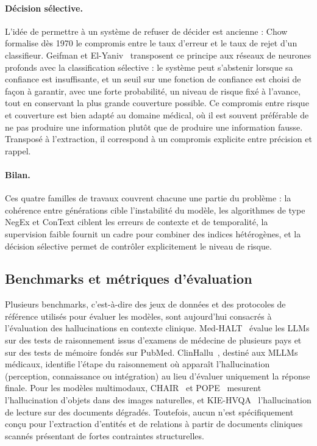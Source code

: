\paragraph{Décision sélective.}
L'idée de permettre à un système de refuser de décider est ancienne : Chow~\cite{chow1970reject} formalise dès 1970 le compromis entre le taux d'erreur et le taux de rejet d'un classifieur. Geifman et El-Yaniv~\cite{geifman2017selective} transposent ce principe aux réseaux de neurones profonds avec la classification sélective : le système peut s'abstenir lorsque sa confiance est insuffisante, et un seuil sur une fonction de confiance est choisi de façon à garantir, avec une forte probabilité, un niveau de risque fixé à l'avance, tout en conservant la plus grande couverture possible. Ce compromis entre risque et couverture est bien adapté au domaine médical, où il est souvent préférable de ne pas produire une information plutôt que de produire une information fausse. Transposé à l'extraction, il correspond à un compromis explicite entre précision et rappel.

\paragraph{Bilan.}
Ces quatre familles de travaux couvrent chacune une partie du problème : la cohérence entre générations cible l'instabilité du modèle, les algorithmes de type NegEx et ConText ciblent les erreurs de contexte et de temporalité, la supervision faible fournit un cadre pour combiner des indices hétérogènes, et la décision sélective permet de contrôler explicitement le niveau de risque.

\subsection{Benchmarks et métriques d'évaluation}

Plusieurs benchmarks, c'est-à-dire des jeux de données et des protocoles de référence utilisés pour évaluer les modèles, sont aujourd'hui consacrés à l'évaluation des hallucinations en contexte clinique. Med-HALT~\cite{pal2023medhalt} évalue les LLMs sur des tests de raisonnement issus d'examens de médecine de plusieurs pays et sur des tests de mémoire fondés sur PubMed. ClinHallu~\cite{yang2026clinhallu}, destiné aux MLLMs médicaux, identifie l'étape du raisonnement où apparaît l'hallucination (perception, connaissance ou intégration) au lieu d'évaluer uniquement la réponse finale. Pour les modèles multimodaux, CHAIR~\cite{rohrbach2018chair} et POPE~\cite{li2023pope} mesurent l'hallucination d'objets dans des images naturelles, et KIE-HVQA~\cite{he2025seeing} l'hallucination de lecture sur des documents dégradés. Toutefois, aucun n'est spécifiquement conçu pour l'extraction d'entités et de relations à partir de documents cliniques scannés présentant de fortes contraintes structurelles.

